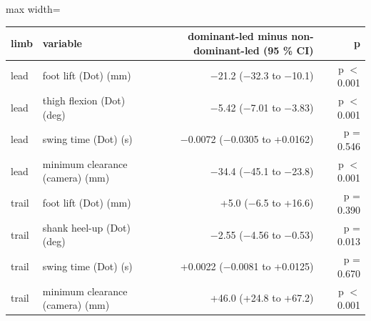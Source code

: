 \begin{adjustbox}{max width=\textwidth}
{\footnotesize
\begin{tabular}{llrr}
\toprule
\textbf{limb} & \textbf{variable} & \textbf{dominant-led minus non-dominant-led (95 \% CI)} & \textbf{p} \\
\midrule
lead & foot lift (Dot) (mm) & $-$21.2 ($-$32.3 to $-$10.1) & p $<$ 0.001 \\
lead & thigh flexion (Dot) (deg) & $-$5.42 ($-$7.01 to $-$3.83) & p $<$ 0.001 \\
lead & swing time (Dot) (s) & $-$0.0072 ($-$0.0305 to +0.0162) & p = 0.546 \\
lead & minimum clearance (camera) (mm) & $-$34.4 ($-$45.1 to $-$23.8) & p $<$ 0.001 \\
trail & foot lift (Dot) (mm) & +5.0 ($-$6.5 to +16.6) & p = 0.390 \\
trail & shank heel-up (Dot) (deg) & $-$2.55 ($-$4.56 to $-$0.53) & p = 0.013 \\
trail & swing time (Dot) (s) & +0.0022 ($-$0.0081 to +0.0125) & p = 0.670 \\
trail & minimum clearance (camera) (mm) & +46.0 (+24.8 to +67.2) & p $<$ 0.001 \\
\bottomrule
\end{tabular}
}
\end{adjustbox}
